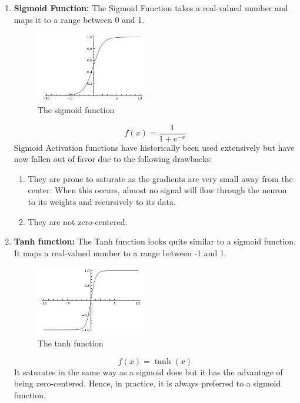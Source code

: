 \documentclass[twoside]{article}
\begin{document}
\begin{enumerate}

\item \textbf{Sigmoid Function:}
The Sigmoid Function takes a real-valued number and maps it to a range between 0 and 1.
\begin{figure}[!htb]
\centering
\includegraphics[height = 1.2in]{pics/sigmoid.jpeg}
\caption{The sigmoid function\cite{cs231n-website}}
\label{fig:sigmoid}
\end{figure}
\begin{equation*}
f(x) = \frac{1}{1+e^{-x}}
\end{equation*}
Sigmoid Activation functions have historically been used extensively but have now fallen out of favor due to the following drawbacks:
\begin{enumerate}
\item They are prone to saturate as the gradients are very small away from the center. When this occurs, almost no signal will flow through the neuron to its weights and recursively to its data.
\item They are not zero-centered.
\end{enumerate}

\item \textbf{Tanh function:}
The Tanh function looks quite similar to a sigmoid function. It maps a real-valued number to a range between -1 and 1.
\begin{figure}[!htb]
\centering
\includegraphics[height = 1.2in]{pics/tanh.jpeg}
\caption{The tanh function\cite{cs231n-website}}
\label{fig:tanh}
\end{figure}
\begin{equation*}
f(x) = \tanh(x)
\end{equation*}
It saturates in the same way as a sigmoid does but it has the advantage of being zero-centered. Hence, in practice, it is always preferred to a sigmoid function.


\end{enumerate}
\end{document}
